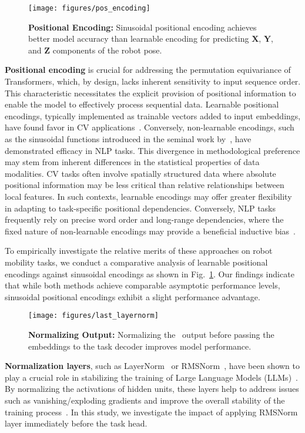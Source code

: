 \begin{figure}[t]
  \centering
  \texttt{[image: figures/pos\_encoding]}
  \caption{\textbf{Positional Encoding:} Sinusoidal positional encoding achieves better model accuracy than learnable encoding for predicting $\mathbf{X}$, $\mathbf{Y}$, and $\mathbf{Z}$ components of the robot pose.}
  \label{fig:pos_encoding}
\end{figure}

\textbf{Positional encoding} is crucial for addressing the permutation equivariance of Transformers, which, by design, lacks inherent sensitivity to input sequence order. This characteristic necessitates the explicit provision of positional information to enable the model to effectively process sequential data. Learnable positional encodings, typically implemented as trainable vectors added to input embeddings, have found favor in CV applications~\cite{he2022masked}. Conversely, non-learnable encodings, such as the sinusoidal functions introduced in the seminal work by~\citet{vaswani2017attention}, have demonstrated efficacy in NLP tasks.
This divergence in methodological preference may stem from inherent differences in the statistical properties of data modalities. CV tasks often involve spatially structured data where absolute positional information may be less critical than relative relationships between local features. In such contexts, learnable encodings may offer greater flexibility in adapting to task-specific positional dependencies. Conversely, NLP tasks frequently rely on precise word order and long-range dependencies, where the fixed nature of non-learnable encodings may provide a beneficial inductive bias~\cite{weng2024navigating}.

To empirically investigate the relative merits of these approaches on robot mobility tasks, we conduct a comparative analysis of learnable positional encodings against sinusoidal encodings as shown in Fig.~\ref{fig:pos_encoding}. Our findings indicate that while both methods achieve comparable asymptotic performance levels, sinusoidal positional encodings exhibit a slight performance advantage.

\begin{figure}[t]
  \centering
  \texttt{[image: figures/last\_layernorm]}
  \caption{\textbf{Normalizing Output:} Normalizing the \tr~output before passing the embeddings to the task decoder improves model performance.}
  \label{fig:last_layernorm}
\end{figure}
\textbf{Normalization layers}, such as LayerNorm~\cite{ba2016layer} or RMSNorm~\cite{zhang2019root}, have been shown to play a crucial role in stabilizing the training of Large Language Models (LLMs)~\cite{loshchilov2024ngpt}. By normalizing the activations of hidden units, these layers help to address issues such as vanishing/exploding gradients and improve the overall stability of the training process~\cite{xiong2020layer}. In this study, we investigate the impact of applying RMSNorm layer immediately before the task head.

